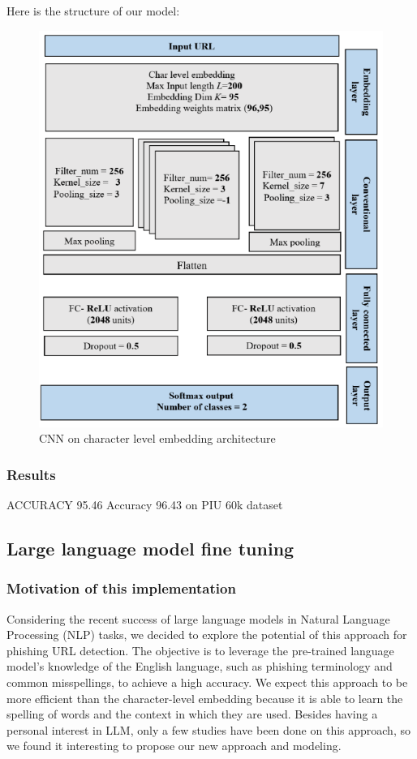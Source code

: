 \documentclass{article}
\begin{document}
    Here is the structure of our model:
    \begin{figure}[H]
        \centering
        \includegraphics[width=0.8\linewidth]{report_img/cnn_configuration}
        \caption{CNN on character level embedding architecture}
        \label{fig:CNN}
    \end{figure}

    \subsubsection{Results}

    \cite{CharacterLevelCNN} ACCURACY 95.46
    \cite{PhishingLoginURLDetection} Accuracy 96.43 on PIU 60k dataset

    \subsection{Large language model fine tuning}\label{subsec:large-language-model-finetuning}

    \subsubsection{Motivation of this implementation}

    Considering the recent success of large language models in Natural Language Processing (NLP) tasks, we decided to explore the potential of this approach for phishing URL detection. The objective is to leverage the pre-trained language model's knowledge of the English language, such as phishing terminology and common misspellings, to achieve a high accuracy. We expect this approach to be more efficient than the character-level embedding because it is able to learn the spelling of words and the context in which they are used. Besides having a personal interest in LLM, only a few studies have been done on this approach, so we found it interesting to propose our new approach and modeling.
\end{document}
